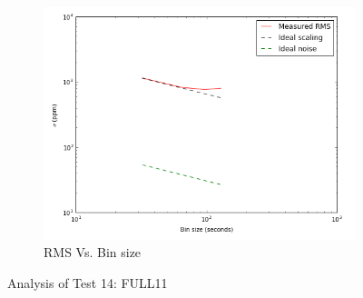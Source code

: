 \documentclass[conference]{IEEEtran}
\begin{document}
\begin{figure}[H]
    \begin{subfigure}{3}
        \includegraphics[scale=0.6]{rms_test14}
        \caption{RMS Vs. Bin size}
    \end{subfigure}
    \caption{Analysis of Test 14: FULL11}
\end{figure}
\end{document}
